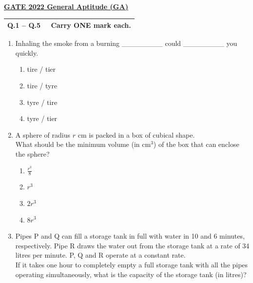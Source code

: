 \documentclass[journal,12pt,onecolumn]{exam}
\theoremstyle{remark}
\begin{document}
\textbf{\underline {GATE 2022 General Aptitude (GA)}}
\vspace{1em}

\begin{tabular}{|p{15cm}|}
\hline
\textbf{Q.1 -- Q.5 \ \ Carry ONE mark each.} \\
\hline
\end{tabular}
\vspace{1em}



\begin{enumerate}
    \item Inhaling the smoke from a burning \_\_\_\_\_\_\_\_ could \_\_\_\_\_\_\_\_ you quickly.
    \begin{enumerate}
        \item tire / tier
        \item tire / tyre
        \item tyre / tire
        \item tyre / tier
    \end{enumerate}



    \item A sphere of radius \( r \) cm is packed in a box of cubical shape.\\
    What should be the minimum volume (in cm\(^3\)) of the box that can enclose the sphere?
    
    \begin{enumerate}
        \item \( \frac{r^3}{8} \)
        \item \( r^3 \)
        \item \( 2r^3 \)
        \item \( 8r^3 \)
    \end{enumerate}

 \item Pipes P and Q can fill a storage tank in full with water in 10 and 6 minutes, respectively. Pipe R draws the water out from the storage tank at a rate of 34 litres per minute. P, Q and R operate at a constant rate.\\

    If it takes one hour to completely empty a full storage tank with all the pipes operating simultaneously, what is the capacity of the storage tank (in litres)?


\end{enumerate}
\end{document}
